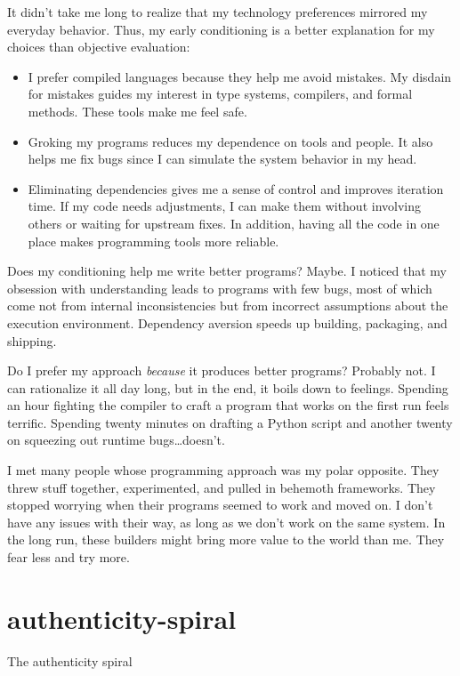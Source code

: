 \documentclass{article}
\begin{document}
It didn't take me long to realize that my technology preferences mirrored my everyday behavior.
Thus, my early conditioning is a better explanation for my choices than objective evaluation:

\begin{itemize}
\item
  I prefer compiled languages because they help me avoid mistakes.
  My disdain for mistakes guides my interest in type systems, compilers, and formal methods.
  These tools make me feel safe.
\item
  Groking my programs reduces my dependence on tools and people.
  It also helps me fix bugs since I can simulate the system behavior in my head.
\item
  Eliminating dependencies gives me a sense of control and improves iteration time.
  If my code needs adjustments, I can make them without involving others or waiting for upstream fixes.
  In addition, having all the code in one place makes programming tools more reliable.
\end{itemize}

Does my conditioning help me write better programs? Maybe.
I noticed that my obsession with understanding leads to programs with few bugs,
most of which come not from internal inconsistencies but from incorrect assumptions about the execution environment.
Dependency aversion speeds up building, packaging, and shipping.

Do I prefer my approach \emph{because} it produces better programs? Probably not.
I can rationalize it all day long,  but in the end, it boils down to feelings.
Spending an hour fighting the compiler to craft a program that works on the first run feels terrific.
Spending twenty minutes on drafting a Python script and another twenty on squeezing out runtime bugs\ldots  doesn't.

I met many people whose programming approach was my polar opposite.
They threw stuff together, experimented, and pulled in behemoth frameworks.
They stopped worrying when their programs seemed to work and moved on.
I don't have any issues with their way, as long as we don't work on the same system.
In the long run, these builders might bring more value to the world than me.
They fear less and try more.

\section{authenticity-spiral}{The authenticity spiral}
\end{document}
